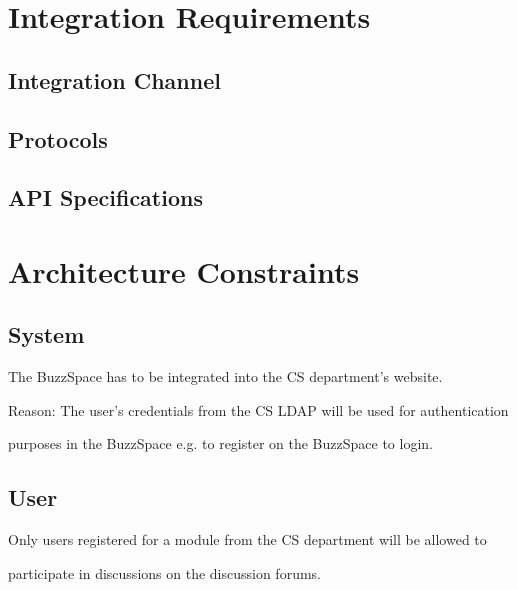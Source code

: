 \documentclass[a4paper,12pt]{report}
\begin{document}

	
	
\section{Integration Requirements}
\subsection{Integration Channel}
\subsection{Protocols}
\subsection{API Specifications}

\newpage
\section{Architecture Constraints}

\subsection{System}
	\begin{description}
\item The BuzzSpace has to be integrated into the CS department’s website. 
 \item Reason: The user’s credentials from the CS LDAP will be used for authentication 
\item  purposes in the BuzzSpace e.g. to register on the BuzzSpace to login.
\end{description}

\subsection{User}
	\begin{description}
	\item[$\bullet$] 
Only users registered for a module from the CS department will be allowed to 
\item participate in discussions on the discussion forums.
\end{description}
\end{document}
